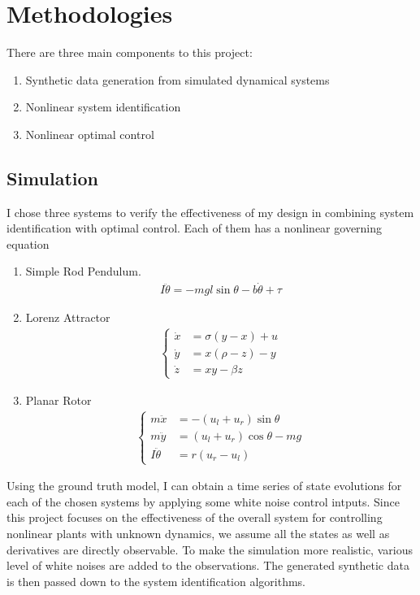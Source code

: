 \documentclass[10pt,twocolumn]{article}
\begin{document}
\section{Methodologies}

There are three main components to this project:
\begin{enumerate}
  \item Synthetic data generation from simulated dynamical systems
  \item Nonlinear system identification
  \item Nonlinear optimal control
\end{enumerate}

\subsection{Simulation}\label{sec:sim}

I chose three systems to verify the effectiveness of my design in combining
system identification with optimal control. Each of them has a nonlinear governing equation
\begin{enumerate}
  \item Simple Rod Pendulum.
    \begin{gather}\label{eqa:pendulum}
      I \ddot{\theta} = -mgl \sin{\theta} - b\dot{\theta} + \tau
    \end{gather}

  \item Lorenz Attractor
    \begin{gather}\label{eqa:lorenz}
      \left\{\begin{aligned}
        \dot{x} &= \sigma (y - x) + u \\
        \dot{y} &=x (\rho - z) - y \\
        \dot{z} &=xy - \beta z
      \end{aligned}\right.
    \end{gather}

  \item Planar Rotor
    \begin{gather}\label{eqa:rotor}
      \left\{\begin{aligned}
        m\ddot{x} &= -(u_l + u_r) \sin{\theta} \\
        m\ddot{y} &= (u_l + u_r) \cos{\theta} - mg \\
        I\ddot{\theta} &= r(u_r - u_l)
      \end{aligned}\right.
    \end{gather}
\end{enumerate}
Using the ground truth model, I can obtain a time series of state evolutions for
each of the chosen systems by applying some white noise control intputs. Since
this project focuses on the effectiveness of the overall system for controlling
nonlinear plants with unknown dynamics, we assume all the states as well as derivatives
are directly observable. To make the simulation more realistic, various level of white noises
are added to the observations. The generated synthetic data is then passed down to
the system identification algorithms.
\end{document}
